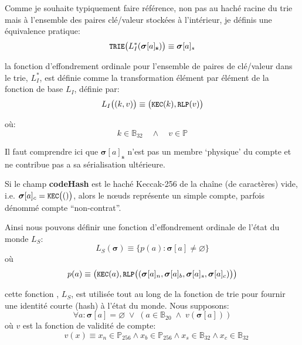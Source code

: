 \documentclass[9pt,oneside]{amsart}
\begin{document}
\begin{multicols}{2}
Comme je souhaite typiquement faire référence, non pas au haché racine du trie mais à l'ensemble des paires clé/valeur stockées à l'intérieur, je définis une équivalence pratique: 
\begin{equation}
\texttt{\small TRIE}\big(L_I^*(\boldsymbol{\sigma}[a]_\mathbf{s})\big) \equiv \boldsymbol{\sigma}[a]_s
\end{equation}

la fonction d'effondrement ordinale pour l'ensemble de paires de clé/valeur dans le trie, $L_I^*$, est définie comme la transformation élément par élément de la fonction de base $L_I$, définie par:
\begin{equation}
L_I\big( (k, v) \big) \equiv \big(\texttt{\small KEC}(k), \texttt{\small RLP}(v)\big)
\end{equation}

où:
\begin{equation}
k \in \mathbb{B}_{32} \quad \wedge \quad v \in \mathbb{P}
\end{equation}

Il faut comprendre ici que $\boldsymbol{\sigma}[a]_\mathbf{s}$ n'est pas un membre `physique' du compte et ne contribue pas a sa sérialisation ultérieure.

Si le champ \textbf{codeHash} est le haché Keccak-256 de la chaîne (de caractères) vide, i.e. $\boldsymbol{\sigma}[a]_c = \texttt{\small KEC}\big(()\big)$, alors le n\oe{}uds représente un simple compte, parfois dénommé compte ``non-contrat''.

Ainsi nous pouvons définir une fonction d'effondrement ordinale de l'état du monde $L_S$:
\begin{equation}
L_S(\boldsymbol{\sigma}) \equiv \{ p(a): \boldsymbol{\sigma}[a] \neq \varnothing \}
\end{equation}
où
\begin{equation}
p(a) \equiv  \big(\texttt{\small KEC}(a), \texttt{\small RLP}\big( (\boldsymbol{\sigma}[a]_n, \boldsymbol{\sigma}[a]_b, \boldsymbol{\sigma}[a]_s, \boldsymbol{\sigma}[a]_c) \big) \big)
\end{equation}

cette fonction , $L_S$, est utilisée tout au long de la fonction de trie pour fournir une identité courte (hash) à l'état du monde. Nous supposons:
\begin{equation}
\forall a: \boldsymbol{\sigma}[a] = \varnothing \; \vee \; (a \in \mathbb{B}_{20} \; \wedge \; v(\boldsymbol{\sigma}[a]))
\end{equation}
où $v$ est la fonction de validité de compte:
\begin{equation}
\quad v(x) \equiv x_n \in \mathbb{P}_{256} \wedge x_b \in \mathbb{P}_{256} \wedge x_s \in \mathbb{B}_{32} \wedge x_c \in \mathbb{B}_{32}
\end{equation}


\end{multicols}
\end{document}
